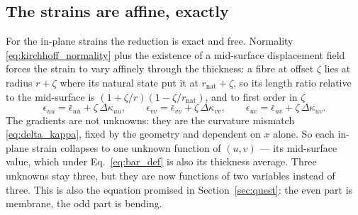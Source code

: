 \documentclass[11pt]{article}
\begin{document}
\subsection{The strains are affine, exactly}\label{sec:strain_affine}
For the in-plane strains the reduction is exact and free. Normality
\eqref{eq:kirchhoff_normality} plus the existence of a mid-surface displacement
field forces the strain to vary affinely through the thickness: a fibre at offset
$\zeta$ lies at radius $r+\zeta$ where its natural state put it at
$r_{\mathrm{nat}}+\zeta$, so its length ratio relative to the mid-surface is
$\left(1+\zeta/r\right)\left(1-\zeta/r_{\mathrm{nat}}\right)$, and to first order
in $\zeta$
\begin{equation}\label{eq:strain_thickness}
    \boxed{\;\epsilon_{uu} = \bar\epsilon_{uu} + \zeta\,\Delta\kappa_{uu},
    \qquad
    \epsilon_{vv} = \bar\epsilon_{vv} + \zeta\,\Delta\kappa_{vv},
    \qquad
    \epsilon_{uv} = \bar\epsilon_{uv} + \zeta\,\Delta\kappa_{uv}.\;}
\end{equation}
The gradients are not unknowns: they are the curvature mismatch
\eqref{eq:delta_kappa}, fixed by the geometry and dependent on $x$ alone. So each
in-plane strain collapses to one unknown function of $(u,v)$ --- its mid-surface
value, which under Eq.~\eqref{eq:bar_def} is also its thickness average. Three
unknowns stay three, but they are now functions of two variables instead of
three. This is also the equation promised in Section~\ref{sec:quest}: the even
part is membrane, the odd part is bending.
\end{document}
